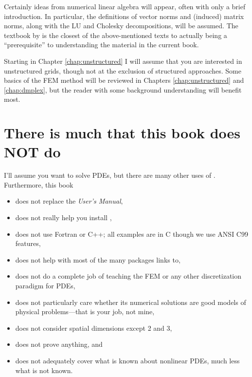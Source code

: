 Certainly ideas from numerical linear algebra \citep{Greenbaum1997,TrefethenBau} will appear, often with only a brief introduction.  In particular, the definitions of vector norms and (induced) matrix norms, along with the LU and Cholesky decompositions, will be assumed.  The textbook by \citet{TrefethenBau} is the closest of the above-mentioned texts to actually being a ``prerequisite'' to understanding the material in the current book.

Starting in Chapter \ref{chap:unstructured} I will assume that you are interested in unstructured grids, though not at the exclusion of structured approaches.  Some basics of the FEM method will be reviewed in Chapters \ref{chap:unstructured} and \ref{chap:dmplex}, but the reader with some background understanding will benefit most.


\section{There is much that this book does NOT do}

I'll assume you want to solve PDEs, but there are many other uses of \PETSc.  Furthermore, this book\begin{itemize}
\item  does not replace the \PETSc \emph{User's Manual},
\item  does not really help you install \PETSc,
\item  does not use Fortran or C++; all examples are in C though we use ANSI C99 features,
\item  does not help with most of the many packages \PETSc links to,
\item  does not do a complete job of teaching the FEM or any other discretization paradigm for PDEs,
\item  does not particularly care whether its numerical solutions are good models of physical problems---that is your job, not mine,
\item  does not consider spatial dimensions except 2 and 3,
\item  does not prove anything, and
\item  does not adequately cover what is known about nonlinear PDEs, much less what is not known.
\end{itemize}


